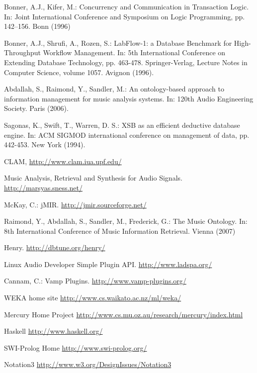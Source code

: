 \documentclass[runningheads]{llncs}
\begin{document}
\begin{thebibliography}{4}

 Bonner, A.J., Kifer, M.: Concurrency and Communication in Transaction Logic. In: Joint International Conference and Symposium on Logic Programming, pp. 142--156. Bonn (1996)

 Bonner, A.J., Shrufi, A., Rozen, S.: LabFlow-1: a Database Benchmark for High-Throughput Workflow Management. In: 5th International Conference on Extending Database Technology, pp. 463-478. Springer-Verlag, Lecture Notes in Computer Science, volume 1057. Avignon (1996).

 Abdallah, S., Raimond, Y., Sandler, M.: An ontology-based approach to information management for music analysis systems. In: 120th Audio Engineering Society. Paris (2006).

 Sagonas, K., Swift, T., Warren, D. S.: {XSB} as an efficient deductive database engine. In: ACM SIGMOD international conference on management of data, pp. 442-453. New York (1994).

 CLAM, \url{http://www.clam.iua.upf.edu/}

 Music Analysis, Retrieval and Synthesis for Audio Signals. \url{http://marsyas.sness.net/}

 McKay, C.: jMIR. \url{http://jmir.sourceforge.net/}

 Raimond, Y., Abdallah, S., Sandler, M., Frederick, G.: The Music Ontology. In: 8th International Conference of Music Information Retrieval. Vienna (2007)

 Henry. \url{http://dbtune.org/henry/} 

 Linux Audio Developer Simple Plugin API. \url{http://www.ladspa.org/}

 Cannam, C.: Vamp Plugins. \url{http://www.vamp-plugins.org/}

 WEKA home site \url{http://www.cs.waikato.ac.nz/ml/weka/}

 Mercury Home Project \url{http://www.cs.mu.oz.au/research/mercury/index.html}

 Haskell \url{http://www.haskell.org/}

 SWI-Prolog Home \url{http://www.swi-prolog.org/}

 Notation3 \url{http://www.w3.org/DesignIssues/Notation3}

\end{thebibliography}
\end{document}
